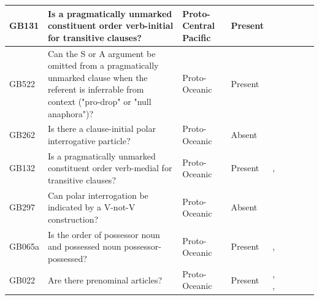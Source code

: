 \documentclass[a4paper,10pt]{article} %
\begin{document}
\begin{landscape}
\begin{longtable}{| p{2cm}| p{3cm}| p{2.5cm}|p{2cm}|p{2cm}|p{2cm}|p{2cm}|p{2cm}|p{2cm}|}
GB131&Is a pragmatically unmarked constituent order verb-initial for transitive clauses?&Proto-Central Pacific&Present&\citet[122]{kikusawa2002proto}& \cellcolor{hedvig_red!50}{False Negative} & \cellcolor{hedvig_lightgreen!50}{True Positive} & \cellcolor{hedvig_yellow!50}{False Negative} & \cellcolor{hedvig_lightgreen!50}{True Positive} \\ \hline
GB522&Can the S or A argument be omitted from a pragmatically unmarked clause when the referent is inferrable from context ("pro-drop" or "null anaphora")?&Proto-Oceanic&Present&\citet[495]{ross2004morphosyntactic}& \cellcolor{hedvig_lightgreen!50}{True Positive} & \cellcolor{hedvig_yellow!50}{Half} & \cellcolor{hedvig_lightgreen!50}{True Positive} & \cellcolor{hedvig_yellow!50}{Half} \\ \hline
GB262&Is there a clause-initial polar interrogative particle?&Proto-Oceanic&Absent&\citet[89]{lynchrosscrowley_proto_grammar_oceanic}& \cellcolor{hedvig_lightgreen!50}{True Negative} & \cellcolor{hedvig_yellow!50}{Half} & \cellcolor{hedvig_yellow!50}{True Negative} & \cellcolor{hedvig_red!50}{False Positive} \\ \hline
GB132&Is a pragmatically unmarked constituent order verb-medial for transitive clauses?&Proto-Oceanic&Present&\citet[497]{ross2004morphosyntactic}, \citet[117]{pawley1973some}& \cellcolor{hedvig_lightgreen!50}{True Positive} & \cellcolor{hedvig_yellow!50}{Half} & \cellcolor{hedvig_lightgreen!50}{True Positive} & \cellcolor{hedvig_yellow!50}{False Negative} \\ \hline
GB297&Can polar interrogation be indicated by a V-not-V construction?&Proto-Oceanic&Absent&\citet[89]{lynchrosscrowley_proto_grammar_oceanic}& \cellcolor{hedvig_lightgreen!50}{True Negative} & \cellcolor{hedvig_yellow!50}{Half} & \cellcolor{hedvig_yellow!50}{True Negative} & \cellcolor{hedvig_yellow!50}{Half} \\ \hline
GB065a&Is the order of possessor noun and possessed noun possessor-possessed?&Proto-Oceanic&Present&\citet[76]{lynchrosscrowley_proto_grammar_oceanic}, \citet[155-156]{pawley1973some}& \cellcolor{hedvig_lightgreen!50}{True Positive} & \cellcolor{hedvig_yellow!50}{Half} & \cellcolor{hedvig_lightgreen!50}{True Positive} & \cellcolor{hedvig_yellow!50}{Half} \\ \hline
GB022&Are there prenominal articles?&Proto-Oceanic&Present&\citet{crowley1985common}, \citet[70]{lynchrosscrowley_proto_grammar_oceanic}, \citet[112]{pawley1973some}& \cellcolor{hedvig_lightgreen!50}{True Positive} & \cellcolor{hedvig_yellow!50}{Half} & \cellcolor{hedvig_yellow!50}{Half} & \cellcolor{hedvig_yellow!50}{False Negative} \\ \hline

\end{longtable}
\end{landscape}
\end{document}
